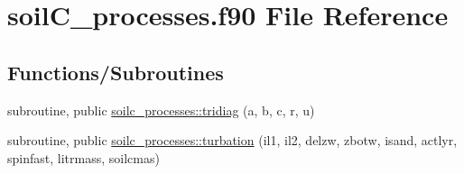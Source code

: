 \hypertarget{soilC__processes_8f90}{}\section{soil\+C\+\_\+processes.\+f90 File Reference}
\label{soilC__processes_8f90}
\subsection*{Functions/\+Subroutines}
\begin{DoxyCompactItemize}
\item 
subroutine, public \hyperlink{group__tridiag_ga4fe3cf136177a8b79351094c7755882b}{soilc\+\_\+processes\+::tridiag} (a, b, c, r, u)
\end{DoxyCompactItemize}
{\bf }\par
\begin{DoxyCompactItemize}
\item 
subroutine, public \hyperlink{group__turbation_gaa54c0aeef1db16c6440fd1b3bc811652}{soilc\+\_\+processes\+::turbation} (il1, il2, delzw, zbotw, isand, actlyr, spinfast, litrmass, soilcmas)
\end{DoxyCompactItemize}

